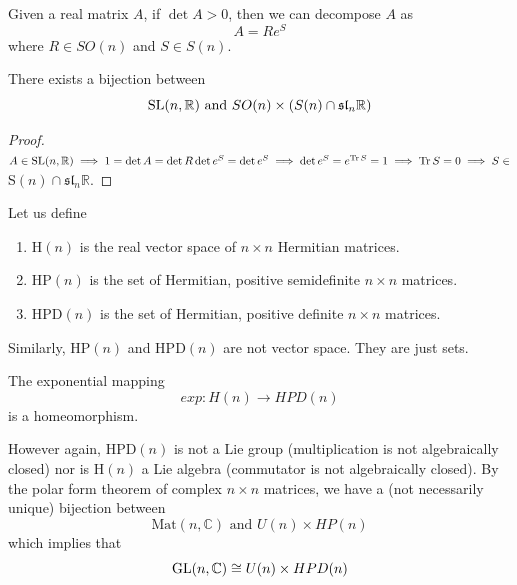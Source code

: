   \begin{corollary}
    Given a real matrix $A$, if $\det{A} > 0$, then we can decompose $A$ as
    \begin{equation}
      A = R e^S
    \end{equation}
    where $R \in SO(n)$ and $S \in S(n)$. 
  \end{corollary}

  \begin{corollary}
    There exists a bijection between
    \begin{equation}
      \operatorname{SL}(n, \mathbb{R}) \text{ and } SO(n) \times (S(n) \cap \mathfrak{sl}_n \mathbb{R})
    \end{equation}
  \end{corollary}
  \begin{proof}
    $A \in \operatorname{SL}(n, \mathbb{R}) \implies 1 = \det{A} = \det{R} \det{e^S} = \det{e^S} \implies \det{e^S} = e^{\operatorname{Tr}{S}} = 1 \implies \operatorname{Tr}{S} = 0 \implies S \in$ S$(n) \cap \mathfrak{sl}_n \mathbb{R}$. 
  \end{proof}

  \begin{definition}
    Let us define
    \begin{enumerate}
      \item H$(n)$ is the real vector space of $n \times n$ Hermitian matrices. 
      \item HP$(n)$ is the set of Hermitian, positive semidefinite $n \times n$ matrices. 
      \item HPD$(n)$ is the set of Hermitian, positive definite $n \times n$ matrices. 
    \end{enumerate}
    Similarly, HP$(n)$ and HPD$(n)$ are not vector space. They are just sets. 
  \end{definition}

  \begin{lemma}
    The exponential mapping
    \begin{equation}
      exp: H(n) \rightarrow HPD(n)
    \end{equation}
    is a homeomorphism. 
  \end{lemma}

  However again, HPD$(n)$ is not a Lie group (multiplication is not algebraically closed) nor is H$(n)$ a Lie algebra (commutator is not algebraically closed). By the polar form theorem of complex $n \times n$ matrices, we have a (not necessarily unique) bijection between
  \begin{equation}
    \text{Mat}(n, \mathbb{C}) \text{ and } U(n) \times HP(n)
  \end{equation}
  which implies that
  \begin{equation}
    \operatorname{GL}(n, \mathbb{C}) \cong U(n) \times HPD (n)
  \end{equation}

